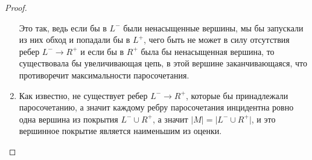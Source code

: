 \begin{proof}
\begin{enumerate}
		Это так, ведь если бы в $L^-$ были ненасыщенные вершины, мы бы запускали из них обход и попадали бы в  $L^+$, чего быть не может в силу отсутствия ребер $L^- \rightarrow R^+$ и если бы в $R^+$ была бы ненасыщенная вершина, то существовала бы увеличивающая цепь, в этой вершине заканчивающаяся, что противоречит максимальности паросочетания.\\
		\item Как известно, не существует ребер  $L^- \rightarrow R^+$, которые бы принадлежали паросочетанию, а значит каждому ребру паросочетания инцидентна ровно одна вершина из покрытия  $L^- \cup R^+$, а значит  $\lvert M \rvert = \lvert L^- \cup R^+ \rvert$, и это вершинное покрытие является наименьшим из оценки.
	\end{enumerate}
\end{proof}
